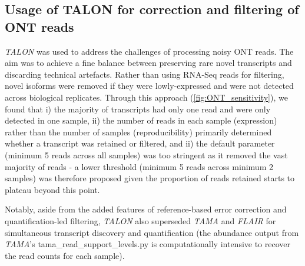 \subsection{Usage of TALON for correction and filtering of ONT reads}
\textit{TALON} was used to address the challenges of processing noisy ONT reads. The aim was to achieve a fine balance between preserving rare novel transcripts and discarding technical artefacts. Rather than using RNA-Seq reads for filtering, novel isoforms were removed if they were lowly-expressed and were not detected across biological replicates. Through this approach (\cref{fig:ONT_sensitivity}), we found that i) the majority of transcripts had only one read and were only detected in one sample, ii) the number of reads in each sample (expression) rather than the number of samples (reproducibility) primarily determined whether a transcript was retained or filtered, and ii) the default parameter (minimum 5 reads across all samples) was too stringent as it removed the vast majority of reads - a lower threshold (minimum 5 reads across minimum 2 samples) was therefore proposed given the proportion of reads retained starts to plateau beyond this point.  

Notably, aside from the added features of reference-based error correction and quantification-led filtering, \textit{TALON} also superseded \textit{TAMA} and \textit{FLAIR} for simultaneous transcript discovery and quantification (the abundance output from \textit{TAMA}'s tama\_read\_support\_levels.py is computationally intensive to recover the read counts for each sample). 
\resumetocwriting